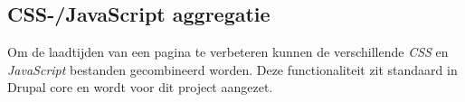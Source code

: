 \subsection{CSS-/JavaScript aggregatie}\label{aggregatie}

Om de laadtijden van een pagina te verbeteren kunnen de verschillende \textit{CSS} en \textit{JavaScript} bestanden gecombineerd worden. Deze functionaliteit zit standaard in Drupal core en wordt voor dit project aangezet.

